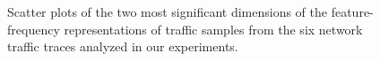 \documentclass{acm_proc_article-sp}
\begin{document}
\begin{figure}[t]
\vspace{-0.9em}
\begin{center}
\caption{Scatter plots of the two most significant dimensions of the feature-frequency representations of traffic samples from the six network traffic traces analyzed in our experiments.} 
\end{center}
\vspace{-2em}
\end{figure}

\end{document}
